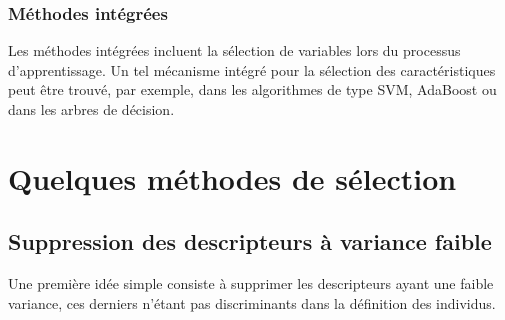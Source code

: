 \documentclass[letterpaper,10pt,french]{sphinxmanual}
\begin{document}
\subsubsection{Méthodes intégrées}
\label{\detokenize{selection:methodes-integrees}}
\sphinxAtStartPar
Les méthodes intégrées incluent la sélection de variables lors du processus d’apprentissage. Un tel mécanisme intégré pour la sélection des caractéristiques peut être trouvé, par
exemple, dans les algorithmes de type SVM,  AdaBoost  ou dans les
arbres de décision.


\section{Quelques méthodes de sélection}
\label{\detokenize{selection:quelques-methodes-de-selection}}

\subsection{Suppression des descripteurs à variance faible}
\label{\detokenize{selection:suppression-des-descripteurs-a-variance-faible}}
\sphinxAtStartPar
Une première idée simple consiste à supprimer les descripteurs ayant une faible variance, ces derniers n’étant pas discriminants dans la définition des individus.
\end{document}
